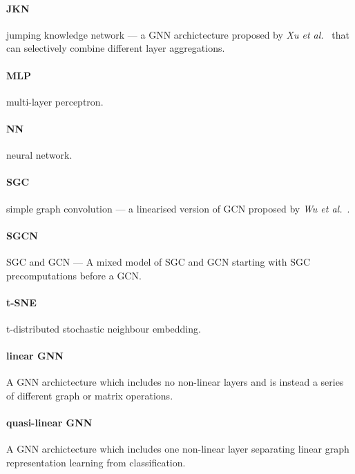 \paragraph{JKN}
jumping knowledge network --- a GNN archictecture proposed by \textit{Xu et al.}~\cite{xu2018representation} that can selectively combine different layer aggregations.

\paragraph{MLP}
multi-layer perceptron.

\paragraph{NN}
neural network.

\paragraph{SGC}
simple graph convolution --- a linearised version of GCN proposed by \textit{Wu et al.}~\cite{wu2019simplifying}.

\paragraph{SGCN}
SGC and GCN --- A mixed model of SGC and GCN starting with SGC precomputations before a GCN.

\paragraph{t-SNE}
t-distributed stochastic neighbour embedding.

\paragraph{linear GNN}
A GNN archictecture which includes no non-linear layers and is instead a series of different graph or matrix operations.

\paragraph{quasi-linear GNN}
A GNN archictecture which includes one non-linear layer separating linear graph representation learning from classification.

